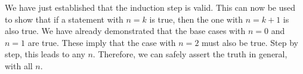 \documentclass{article}
\begin{document}
We have just established that the induction step is valid. This can now be
used to show that if a statement with $n = k$ is true, then the one with 
$n = k + 1$ is also true. We have already demonstrated that the base cases
with $n = 0$ and $n = 1$ are true. These imply that the case with $n = 2$ 
must also be true. Step by step, this leads to any $n$. Therefore, we can 
safely assert the truth in general, with all $n$.
\end{document}

